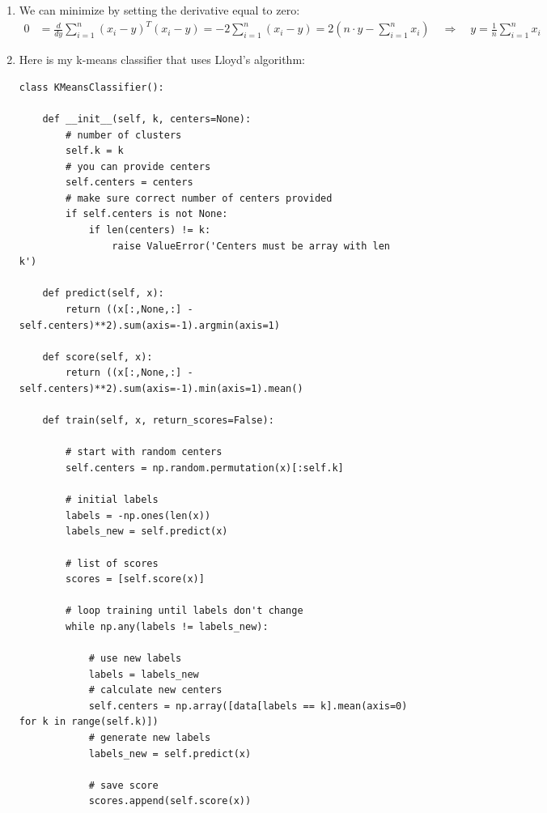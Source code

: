 \documentclass{article}
\begin{document}
\begin{enumerate}
        \item We can minimize by setting the derivative equal to zero:
        \begin{align*}
                0 &= \frac{d}{dy} \sum_{i=1}^n (x_i-y)^T (x_i-y)
                = -2 \sum_{i=1}^n (x_i-y)
                = 2 \left( n \cdot y - \sum_{i=1}^n x_i \right)
                \quad \Longrightarrow \quad
                y = \frac{1}{n} \sum_{i=1}^n x_i
        \end{align*}

        \item Here is my k-means classifier that uses Lloyd's algorithm:
        \begin{verbatim}
class KMeansClassifier():
    
    def __init__(self, k, centers=None):
        # number of clusters
        self.k = k
        # you can provide centers
        self.centers = centers
        # make sure correct number of centers provided
        if self.centers is not None:
            if len(centers) != k:
                raise ValueError('Centers must be array with len k')
                
    def predict(self, x):
        return ((x[:,None,:] - self.centers)**2).sum(axis=-1).argmin(axis=1)
    
    def score(self, x):
        return ((x[:,None,:] - self.centers)**2).sum(axis=-1).min(axis=1).mean()
    
    def train(self, x, return_scores=False):
        
        # start with random centers
        self.centers = np.random.permutation(x)[:self.k]
        
        # initial labels
        labels = -np.ones(len(x))
        labels_new = self.predict(x)
        
        # list of scores
        scores = [self.score(x)]
        
        # loop training until labels don't change
        while np.any(labels != labels_new):
            
            # use new labels
            labels = labels_new
            # calculate new centers
            self.centers = np.array([data[labels == k].mean(axis=0) for k in range(self.k)])
            # generate new labels
            labels_new = self.predict(x)
            
            # save score
            scores.append(self.score(x))
            

\end{verbatim}
\end{enumerate}
\end{document}
